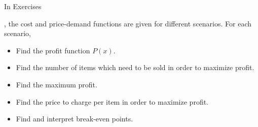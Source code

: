 {\noindent In Exercises}
{, the cost and price-demand functions are given for different scenarios.  For each scenario,


\begin{itemize}

\item  Find the profit function $P(x)$.

\item  Find the number of items which need to be sold in order to maximize profit.

\item  Find the maximum profit.

\item  Find the price to charge per item in order to maximize profit.

\item  Find and interpret break-even points.

\end{itemize}
}

